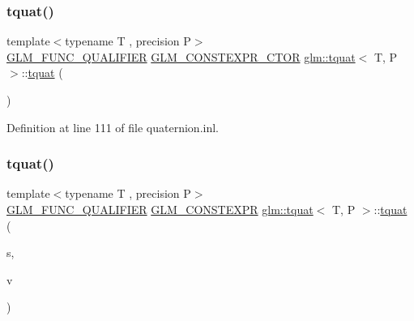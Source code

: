\mbox{\label{structglm_1_1tquat_a8a907726f9a12c025b8dbb572e951e36}} 
\subsubsection{\texorpdfstring{tquat()}{tquat()}\hspace{0.1cm}{\footnotesize\ttfamily [4/13]}}
{\footnotesize\ttfamily template$<$typename T , precision P$>$ \\
\mbox{\hyperlink{setup_8hpp_a33fdea6f91c5f834105f7415e2a64407}{G\+L\+M\+\_\+\+F\+U\+N\+C\+\_\+\+Q\+U\+A\+L\+I\+F\+I\+ER}} \mbox{\hyperlink{setup_8hpp_ad34178a09666081abdb573c14d1f4a5a}{G\+L\+M\+\_\+\+C\+O\+N\+S\+T\+E\+X\+P\+R\+\_\+\+C\+T\+OR}} \mbox{\hyperlink{structglm_1_1tquat}{glm\+::tquat}}$<$ T, P $>$\+::\mbox{\hyperlink{structglm_1_1tquat}{tquat}} (\begin{DoxyParamCaption}\item[{\mbox{\hyperlink{namespaceglm_a807df837905ec286f806a536af03b57f}{ctor}}}]{ }\end{DoxyParamCaption})\hspace{0.3cm}{\ttfamily [explicit]}}



Definition at line 111 of file quaternion.\+inl.

\mbox{\label{structglm_1_1tquat_aa8e343ea23faf2cada6fc99d8e6eb597}} 
\subsubsection{\texorpdfstring{tquat()}{tquat()}\hspace{0.1cm}{\footnotesize\ttfamily [5/13]}}
{\footnotesize\ttfamily template$<$typename T , precision P$>$ \\
\mbox{\hyperlink{setup_8hpp_a33fdea6f91c5f834105f7415e2a64407}{G\+L\+M\+\_\+\+F\+U\+N\+C\+\_\+\+Q\+U\+A\+L\+I\+F\+I\+ER}} \mbox{\hyperlink{setup_8hpp_a08b807947b47031d3a511f03f89645ad}{G\+L\+M\+\_\+\+C\+O\+N\+S\+T\+E\+X\+PR}} \mbox{\hyperlink{structglm_1_1tquat}{glm\+::tquat}}$<$ T, P $>$\+::\mbox{\hyperlink{structglm_1_1tquat}{tquat}} (\begin{DoxyParamCaption}\item[{T const \&}]{s,  }\item[{\mbox{\hyperlink{structglm_1_1tvec3}{tvec3}}$<$ T, P $>$ const \&}]{v }\end{DoxyParamCaption})}



